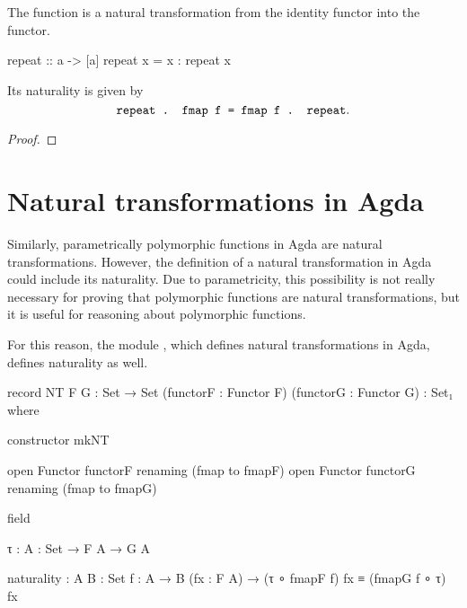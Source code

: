 \begin{example}

  The  function is a natural transformation from
  the identity functor into the \texthaskell{[]} functor.
  \begin{codehaskell}
    repeat :: a -> [a]
    repeat x = x : repeat x
  \end{codehaskell}

  Its naturality is given by
  \begin{equation*}
    \text{\texttt{repeat . fmap f = fmap f . repeat}}
    \text{.}
  \end{equation*}

  \begin{proof}
  \end{proof}

\end{example}

\section{Natural transformations in Agda}
\label{sec:naturals-agda}

Similarly, parametrically polymorphic functions in Agda are natural
transformations. However, the definition of a natural transformation
in Agda could include its naturality. Due to parametricity, this
possibility is not really necessary for proving that polymorphic
functions are natural transformations, but it is useful for reasoning
about polymorphic functions.

For this reason, the module
, which defines natural
transformations in Agda, defines naturality as well.

\begin{codeagda}
  record NT {F G : Set → Set} (functorF : Functor F)
                              (functorG : Functor G) : Set₁ where

    constructor mkNT

    open Functor functorF renaming (fmap to fmapF)
    open Functor functorG renaming (fmap to fmapG)

    field

      τ          : {A : Set} → F A → G A

      naturality : {A B : Set} {f : A → B}
                   (fx : F A) → (τ ∘ fmapF f) fx ≡ (fmapG f ∘ τ) fx
\end{codeagda}

